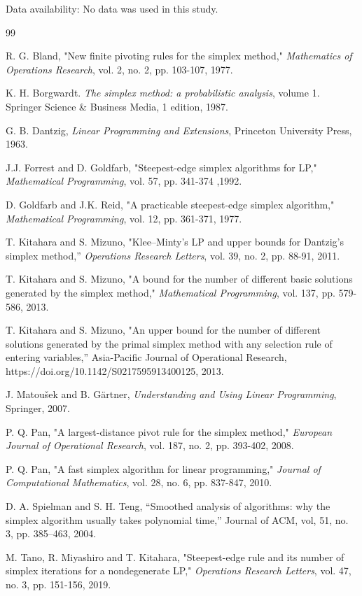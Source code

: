 \documentclass[12pt]{article}
\begin{document}
\noindent Data availability: No data was used in this study.
\begin{thebibliography}{99}

R. G. Bland, "New finite pivoting rules for the simplex method," \textit{Mathematics of Operations Research}, vol. 2, no. 2, pp. 103-107, 1977.

K. H. Borgwardt. \textit{The simplex method: a probabilistic analysis}, volume 1. Springer
Science \& Business Media, 1 edition, 1987.

G. B. Dantzig, \textit{Linear Programming and Extensions}, Princeton University Press, 1963.

J.J. Forrest and D. Goldfarb, "Steepest-edge simplex algorithms for LP," \textit{Mathematical Programming}, vol. 57, pp. 341-374 ,1992.

D. Goldfarb and J.K. Reid, "A practicable steepest-edge simplex algorithm," \textit{Mathematical Programming}, vol. 12, pp. 361-371, 1977.


T. Kitahara and S. Mizuno, "Klee–Minty's LP and upper bounds for Dantzig's simplex method,'' \textit{Operations Research Letters}, vol. 39, no. 2, pp. 88-91, 2011.

T. Kitahara and S. Mizuno, "A bound for the number of different basic solutions generated by the simplex method," \textit{Mathematical Programming}, vol. 137, pp. 579-586, 2013.

T. Kitahara and S. Mizuno, "An upper bound for the number of different solutions generated by the primal simplex method with any selection rule of entering variables,'' 
Asia-Pacific Journal of Operational Research, https://doi.org/10.1142/S0217595913400125, 2013.

J. Matou\v{s}ek and B. G\"{a}rtner, \textit{Understanding and Using Linear Programming}, Springer, 2007.

P. Q. Pan, "A largest-distance pivot rule for the simplex method," \textit{European Journal of Operational Research}, vol. 187, no. 2, pp. 393-402, 2008.

P. Q. Pan, "A fast simplex algorithm for linear programming," \textit{Journal of Computational Mathematics}, vol. 28, no. 6, pp. 837-847, 2010.

D. A. Spielman and S. H. Teng, ``Smoothed analysis of algorithms: why the simplex
algorithm usually takes polynomial time,'' Journal of ACM, vol, 51, no. 3, pp. 385–463, 2004.

M. Tano, R. Miyashiro and T. Kitahara, "Steepest-edge rule and its number of simplex iterations for a nondegenerate LP," 
\textit{Operations Research Letters}, vol. 47, no. 3, pp. 151-156, 2019.
\end{thebibliography}
\end{document}
